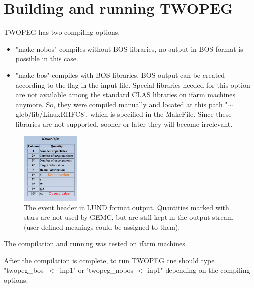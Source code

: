 
\chapter{Building and running TWOPEG}
\label{sect:inp_param}


TWOPEG has two compiling options. 
\begin{itemize}
 
\item "make nobos" compiles without BOS libraries, no output in BOS format is possible in this case.
 
\item "make bos" compiles with BOS libraries. BOS output can be created according to the flag in the input file. Special libraries needed for this option are not available among the standard CLAS libraries on ifarm machines anymore.  So, they were compiled manually and located  at this path "$\sim$gleb/lib/LinuxRHFC8", which is specified in the MakeFile. Since these libraries are not supported, sooner or later they will become irrelevant.
\end{itemize}

\begin{figure}[!ht]
\begin{center}
\includegraphics[width=0.25\textwidth]{pictures/inpparam/lund_out.pdf}
\end{center}
\vspace{-0.6cm}
\caption{\small The event header in LUND format output. Quantities marked with stars are not used by GEMC, but are still kept in the output stream (user defined meanings could be assigned to them).}
\label{fig:lund_out}
\end{figure}

The compilation and running was tested on ifarm machines.

After the compilation is complete, to run TWOPEG one should type "twopeg\_bos~$<$~inp1" or "twopeg\_nobos $<$ inp1" depending on the compiling options.

